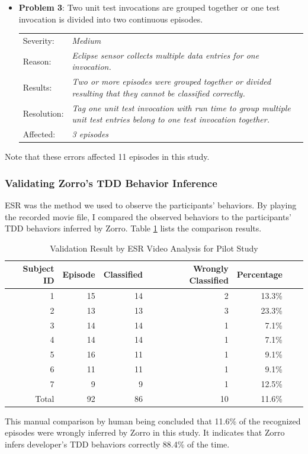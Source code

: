 \begin{itemize}
\item \textbf{Problem 3}: Two unit test invocations are grouped
together or one test invocation is divided into two continuous
episodes.
  \begin{tabular}{lp{10cm}}
    Severity: & \small\textit{Medium}\\
    Reason: & \small\textit{Eclipse sensor collects multiple data 
              entries for one invocation.}\\
    Results: & \small\textit{Two or more episodes were grouped 
               together or divided resulting that they cannot be 
               classified correctly.} \\
    Resolution: & \small\textit{Tag one unit test invocation with run 
                  time to group multiple unit test entries belong to 
                  one test invocation together.} \\
    Affected: & \small\textit{3 episodes}
  \end{tabular}
\end{itemize}

\noindent Note that these errors affected 11 episodes in this study. 

\subsubsection{Validating Zorro's TDD Behavior Inference}
ESR was the method we used to observe the participants' behaviors. By
playing the recorded movie file, I compared the observed behaviors to
the participants' TDD behaviors inferred by Zorro. Table
\ref{tab:EsrPilotStudy} lists the comparison results.
\begin{table}[!h]
\centering
  \begin{tabular}{|r|r|r|r|r|r|r|}
  \hline
    Subject ID & Episode & Classified & Wrongly Classified & Percentage \\ \hline
    1          & 15 &  14 &  2 & 13.3\% \\ \hline
    2          & 13 &  13 &  3 & 23.3\% \\ \hline
    3          & 14 &  14 &  1 &  7.1\% \\ \hline
    4          & 14 &  14 &  1 &  7.1\% \\ \hline
    5          & 16 &  11 &  1 &  9.1\% \\ \hline
    6          & 11 &  11 &  1 &  9.1\% \\ \hline
    7          &  9 &   9 &  1 & 12.5\% \\ \hline \hline
    Total      & 92 &  86 & 10 & 11.6\% \\ 
  \hline
  \end{tabular}
  \caption{Validation Result by ESR Video Analysis for Pilot Study}\label{tab:EsrPilotStudy}  
\end{table}
This manual comparison by human being concluded that 11.6\% of the
recognized episodes were wrongly inferred by Zorro in this study. It
indicates that Zorro infers developer's TDD behaviors correctly 88.4\%
of the time.

